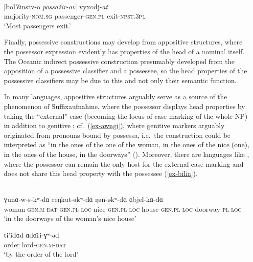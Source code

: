 \documentclass[output=paper
  ,nobabel
  ,draftmode
  ,colorlinks, citecolor=brown
]{langscibook}
\begin{document}
\ea\label{ex-russian} 
\\
\gll {}[bol’šinstv-o \emph{passažir-ov}] vyxodj-\emph{at}\\ 
     \spacebr{}majority-\textsc{nom.sg}	passenger-\textsc{gen.pl}	exit-\textsc{npst.3pl}	\\
\glt `Most passengers exit.'
\z

\noindent Finally, possessive constructions may develop from appositive structures, where the possessor
expression evidently has properties of the head of a nominal itself. The Oceanic indirect possessive
construction presumably developed from the apposition of a possessive classifier and a possessee, so
the head properties of the possessive classifiers may be due to this and not only their semantic
function. 

In many languages, appositive structures arguably serve as a source of the phenomenon of Suffixaufnahme, where the possessor displays head properties by taking the ``external'' case (becoming the locus of case marking of the whole NP) in addition to genitive \citep{Plank1995}; cf.\ (\ref{ex-awngi}), where genitive markers arguably originated from pronouns bound by possessa, i.e.\ the construction could be interpreted as ``in the ones of the one of the woman, in the ones of the nice (one), in the ones of the house, in the doorways'' (\cite{Aristar1995}). Moreover, there are languages like , where the possessor can remain the only host for the external case marking and does not share this head property with the possessee (\ref{ex-bilin}). 


\ea\label{ex-awngi}
\\
\gll ​ɣ​unɑ​-w-s-kʷ-dɑ​ ceŋ​kut-əkʷ-dɑ​ ŋ​ən-əkʷ-dɑ​ ɑ​bjel-kɑ​-dɑ​\\ 
     woman-\textsc{gen.m-dat-gen.pl-loc}   nice-\textsc{gen.pl-loc} house-\textsc{gen.pl-loc} doorway-\textsc{pl-loc}\\
\glt `in the doorways of the woman's nice house'
\z

\ea\label{ex-bilin} 
\gll ti'idɑ​d ɑ​d\"ɑ​ri-​ɣ​ʷ-əd\\ 
     order   lord-\textsc{gen.m-dat}\\
\glt `by the order of the lord'
\z
\end{document}
